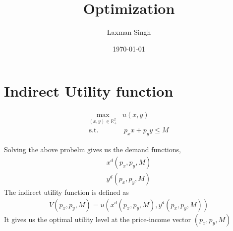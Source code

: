 \documentclass[12pt,a4paper]{article}
\author{Laxman Singh}
\date{\today}
\title{Optimization}
\begin{document}
\section{Indirect Utility function}
\begin{tcolorbox}
    \begin{align*}
        \max_{(x,y) \in \mathbb{R}^2_{+}}& u(x,y)\\
        \text{s.t.}& \ p_{x}x+p_{y}y \leq M
    \end{align*}
\end{tcolorbox}
Solving the above probelm gives us the demand functions,
 \begin{align*}
    x^d(p_{x},p_{y},M)\\
    y^d(p_{x},p_{y},M)      
\end{align*}
The indirect utility function is defined as
 \begin{align*}
    V(p_{x},p_{y},M)=u(x^d(p_{x},p_{y},M),y^d(p_{x},p_{y},M))
\end{align*}
It gives us the optimal utility level at the price-income vector \((p_{x},p_{y},M)\)
\end{document}
